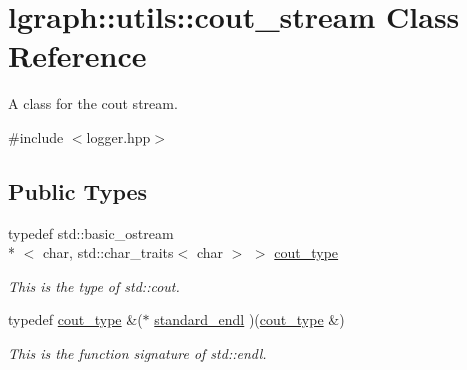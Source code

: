 \hypertarget{classlgraph_1_1utils_1_1cout__stream}{\section{lgraph\-:\-:utils\-:\-:cout\-\_\-stream Class Reference}
\label{classlgraph_1_1utils_1_1cout__stream}
}


A class for the cout stream.  




{\ttfamily \#include $<$logger.\-hpp$>$}

\subsection*{Public Types}
\begin{DoxyCompactItemize}
\item 
\hypertarget{classlgraph_1_1utils_1_1cout__stream_a567e84e8f695f9f06e25a90385bd36bc}{typedef std\-::basic\-\_\-ostream\\*
$<$ char, std\-::char\-\_\-traits$<$ char $>$ $>$ \hyperlink{classlgraph_1_1utils_1_1cout__stream_a567e84e8f695f9f06e25a90385bd36bc}{cout\-\_\-type}}\label{classlgraph_1_1utils_1_1cout__stream_a567e84e8f695f9f06e25a90385bd36bc}

\begin{DoxyCompactList}\small\item\em This is the type of std\-::cout. \end{DoxyCompactList}\item 
\hypertarget{classlgraph_1_1utils_1_1cout__stream_a8d78b6d03f5ae2ffbdc9f859dfe039b3}{typedef \hyperlink{classlgraph_1_1utils_1_1cout__stream_a567e84e8f695f9f06e25a90385bd36bc}{cout\-\_\-type} \&($\ast$ \hyperlink{classlgraph_1_1utils_1_1cout__stream_a8d78b6d03f5ae2ffbdc9f859dfe039b3}{standard\-\_\-endl} )(\hyperlink{classlgraph_1_1utils_1_1cout__stream_a567e84e8f695f9f06e25a90385bd36bc}{cout\-\_\-type} \&)}\label{classlgraph_1_1utils_1_1cout__stream_a8d78b6d03f5ae2ffbdc9f859dfe039b3}

\begin{DoxyCompactList}\small\item\em This is the function signature of std\-::endl. \end{DoxyCompactList}\end{DoxyCompactItemize}
